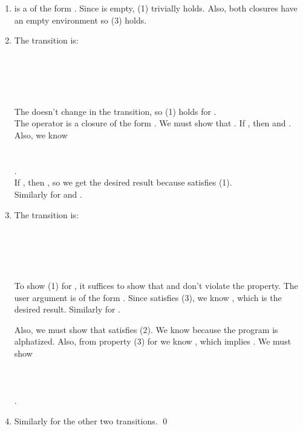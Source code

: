 \documentclass{LMCS}
\theoremstyle{definition} \newtheorem{property}[thm]{Property}
\begin{document}
\begin{enumerate}[]
\item 
  \initstate{} is a \duapply{} of the form
  .
  Since \cvenv{} is empty, (1) trivially holds.
  Also, both closures have an empty environment so (3) holds.
\item
  The  transition is: \\
   \\
   \\
   \\
   
  \\ \\
  The \cvenv{} doesn't change in the transition, so (1) holds for .\\
  The operator is a closure of the form .
  We must show that .
  If , then  and .
  Also, we know \\
   \\
   \\
  . \\
  If , then , so we get the 
  desired result because \cvenv{} satisfies (1). \\
  Similarly for \cuarg{} and \ccarg.
\item
  The  transition is: \\
   \\
   \\
   \\
   
  \\ \\
  To show (1) for , it suffices to show that \cuarg{} and \ccarg{}
  don't violate the property.
  The user argument \cuarg{} is of the form .
  Since \cstat{} satisfies (3), we know , which is the desired result.
  Similarly for \ccarg.

  Also, we must show that  satisfies (2).
  We know  because the program is
  alphatized.
  Also, from property (3) for \cstat{} we know , which implies 
  .
  We must show \\
   \\
   \\
   \\
  .
\item
  Similarly for the other two transitions. \qed
\end{enumerate}
\end{document}

